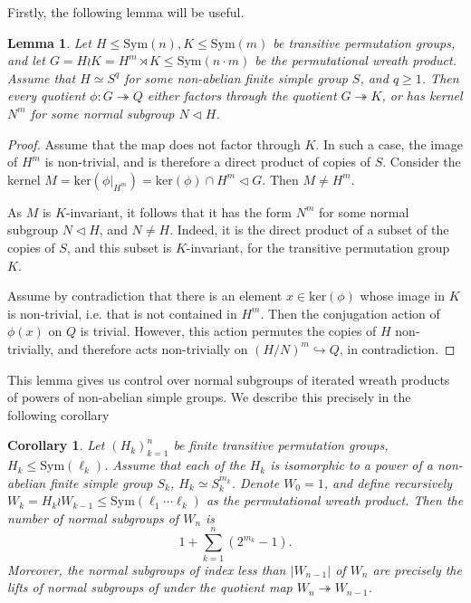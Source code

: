 \documentclass[letterpaper]{amsart}
\newtheorem{lemma}[theorem]{Lemma}
\newtheorem{corollary}[theorem]{Corollary}
\begin{document}
Firstly, the following lemma will be useful.
\begin{lemma}
\label{Normal subgroups of Wreath Products}
    Let $H \leq \mathrm{Sym}(n), K \leq \mathrm{Sym}(m)$ be transitive permutation groups, and let $G = H \wr K = H^m \rtimes K \leq \mathrm{Sym}(n \cdot m)$ be the permutational wreath product. Assume that $H \simeq S^q$ for some non-abelian finite simple group $S$, and $q \geq 1$.
    Then every quotient $\phi: G \twoheadrightarrow Q$ either factors through the quotient $G \twoheadrightarrow K$, or has kernel $N^m$ for some normal subgroup $N \lhd H$.
\end{lemma}
\begin{proof}
    Assume that the map does not factor through $K$. In such a case, the image of $H^m$ is non-trivial, and is therefore a direct product of copies of $S$. Consider the kernel $M = \mathrm{ker}(\phi|_{H^m}) = \mathrm{ker}(\phi) \cap H^m \lhd G$. Then $M \neq H^m$.
    
    As $M$ is $K$-invariant, it follows that it has the form $N^m$ for some normal subgroup $N \lhd H$, and $N \neq H$. Indeed, it is the direct product of a subset of the copies of $S$, and this subset is $K$-invariant, for the transitive permutation group $K$.

    Assume by contradiction that there is an element $x \in \mathrm{ker}(\phi)$ whose image in $K$ is non-trivial, i.e. that is not contained in $H^m$. Then the conjugation action of $\phi(x)$ on $Q$ is trivial. However, this action permutes the copies of $H$ non-trivially, and therefore acts non-trivially on $(H / N)^m \hookrightarrow Q$, in contradiction.
\end{proof}
This lemma gives us control over normal subgroups of iterated wreath products of powers of non-abelian simple groups. We describe this precisely in the following corollary
\begin{corollary}
\label{Normal subgroup count for iterated wreath products}
    Let $(H_k)_{k=1}^n$ be finite transitive permutation groups, $H_k \leq \mathrm{Sym}(\ell_k)$. Assume that each of the $H_k$ is isomorphic to a power of a non-abelian finite simple group $S_k$, $H_k \simeq S_k^{m_k}$. Denote $W_0 = 1$, and define recursively $W_k = H_k \wr W_{k - 1} \leq \mathrm{Sym}(\ell_1 \cdots \ell_k)$ as the permutational wreath product. Then the number of normal subgroups of $W_n$ is $$1 + \sum_{k=1}^n (2^{m_k} - 1).$$
    Moreover, the normal subgroups of index less than $|W_{n - 1}|$ of $W_n$ are precisely the lifts of normal subgroups of under the quotient map $W_n \twoheadrightarrow W_{n - 1}$.
\end{corollary}
\end{document}
